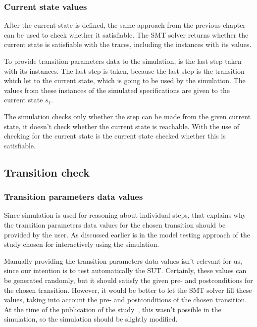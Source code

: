\subsubsection*{Current state values}
After the current state is defined, the same approach from the previous chapter
can be used to check whether it satisfiable. The SMT solver returns whether the
current state is satisfiable with the traces, including the instances with its
values.

To provide transition parameters data to the simulation, is the last step taken
with its instances. The last step is taken, because the last step is the
transition which let to the current state, which is going to be used by the
simulation. The values from these instances of the simulated specifications are
given to the current state $s_{1}$.

The simulation checks only whether the step can be made from the given current
state, it doesn't check whether the current state is reachable. With the use of
checking for the current state is the current state checked whether this is
satisfiable.

\subsection{Transition check}

\subsubsection*{Transition parameters data values}
Since simulation is used for reasoning about individual steps, that explains why
the transition parameters data values for the chosen transition should be
provided by the user. As discussed earlier is in the model testing approach
of the study \cite[p.6]{stoel_storm_vinju_bosman_2016} chosen for interactively
using the simulation.

Manually providing the transition parameters data values
isn't relevant for us, since our intention is to test automatically the SUT.
Certainly, these values can be generated randomly, but it should satisfy the
given pre- and postconditions for the chosen transition. However, it would be
better to let the SMT solver fill these values, taking into account the pre- and
postconditions of the chosen transition. At the time of the publication of the
study~\cite{stoel_storm_vinju_bosman_2016}, this wasn't possible in the simulation, so
the simulation should be slightly modified.

